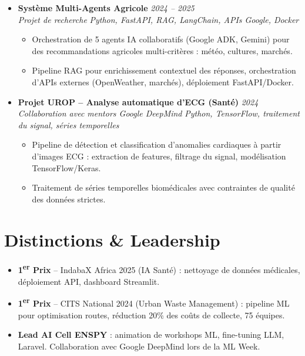 \documentclass[a4paper,11pt]{article}
\begin{document}
\begin{itemize}[leftmargin=*, label={-}]
\item \textbf{Système Multi-Agents Agricole} \hfill \textit{2024 -- 2025} \\
\textit{Projet de recherche} \hfill \textit{Python, FastAPI, RAG, LangChain, APIs Google, Docker}
\vspace{-2pt}
    \begin{itemize}[leftmargin=0.4cm, nosep, label=\tiny$\bullet$]
        \item \small{Orchestration de 5 agents IA collaboratifs (Google ADK, Gemini) pour des recommandations agricoles multi-critères : météo, cultures, marchés.}
        \item \small{Pipeline RAG pour enrichissement contextuel des réponses, orchestration d'APIs externes (OpenWeather, marchés), déploiement FastAPI/Docker.}
    \end{itemize}
\vspace{3pt}

\item \textbf{Projet UROP -- Analyse automatique d'ECG (Santé)} \hfill \textit{2024} \\
\textit{Collaboration avec mentors Google DeepMind} \hfill \textit{Python, TensorFlow, traitement du signal, séries temporelles}
\vspace{-2pt}
    \begin{itemize}[leftmargin=0.4cm, nosep, label=\tiny$\bullet$]
        \item \small{Pipeline de détection et classification d'anomalies cardiaques à partir d'images ECG : extraction de features, filtrage du signal, modélisation TensorFlow/Keras.}
        \item \small{Traitement de séries temporelles biomédicales avec contraintes de qualité des données strictes.}
    \end{itemize}
\vspace{3pt}

\end{itemize}

\section{Distinctions \& Leadership}
\begin{itemize}[leftmargin=*, nosep, label=\tiny$\bullet$]
    \item \small{\textbf{1\textsuperscript{er} Prix} -- IndabaX Africa 2025 (IA Santé) : nettoyage de données médicales, déploiement API, dashboard Streamlit.}
    \item \small{\textbf{1\textsuperscript{er} Prix} -- CITS National 2024 (Urban Waste Management) : pipeline ML pour optimisation routes, réduction 20\% des coûts de collecte, 75 équipes.}
    \item \small{\textbf{Lead AI Cell ENSPY} : animation de workshops ML, fine-tuning LLM, Laravel. Collaboration avec Google DeepMind lors de la ML Week.}
\end{itemize}
\end{document}
